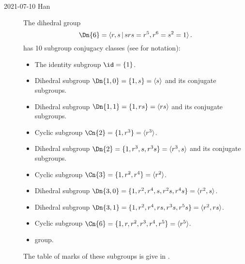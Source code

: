 \begin{description}
\item[2021-07-10 Han]
The dihedral group
\[
\Dn{6} =
\langle r, s \,|\, srs = r^{5}, r^6 = s^2 = 1 \rangle
\,.
\]
has 10 subgroup conjugacy classes (see  for notation):
\begin{itemize}
  \item
  The identity subgroup $\id = \{ 1 \}$.
  \item
  Dihedral subgroup $\Dn{1,0} = \{ 1, s \} = \langle s \rangle$ and its conjugate subgroups.
  \item
  Dihedral subgroup $\Dn{1,1} = \{ 1, rs \} = \langle rs \rangle$ and its conjugate subgroups.
  \item
  Cyclic subgroup $\Cn{2} = \{ 1, r^3 \} = \langle r^3 \rangle$.
  \item
  Dihedral subgroup $\Dn{2} = \{ 1, r^3, s, r^3s \} = \langle r^3, s \rangle$ and its conjugate subgroups.
  \item
  Cyclic subgroup $\Cn{3} = \{ 1, r^2, r^4 \} = \langle r^2 \rangle$.
  \item
  Dihedral subgroup $\Dn{3,0} = \{ 1, r^2, r^4,  s, r^2s, r^4s \} = \langle r^2, s \rangle$.
  \item
  Dihedral subgroup $\Dn{3,1} = \{ 1, r^2, r^4,  rs, r^3s, r^5s \} = \langle r^2, rs \rangle$.
  \item
  Cyclic subgroup $\Cn{6} = \{ 1, r,  r^2, r^3, r^4, r^5 \} = \langle r^5 \rangle$.
  \item
   group.
\end{itemize}
The table of marks of these subgroups is give in .



\end{description}
